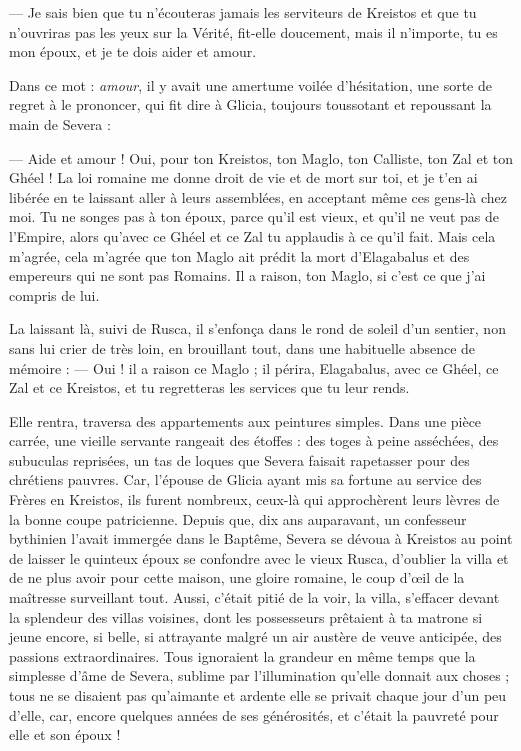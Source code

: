\documentclass[a4paper, 11pt, oneside, polutonikogreek, french]{article}
\begin{document}
--- Je sais bien que tu n'écouteras jamais les serviteurs de Kreistos et que tu n'ouvriras pas les yeux sur la Vérité, fit-elle doucement, mais il n'importe, tu es mon époux, et je te dois aider et amour.

Dans ce mot : \emph{amour}, il y avait une amertume voilée d'hésitation, une sorte de regret à le prononcer, qui fit dire à Glicia, toujours toussotant et repoussant la main de Severa :

--- Aide et amour ! Oui, pour ton Kreistos, ton Maglo, ton Calliste, ton Zal et ton Ghéel ! La loi romaine me donne droit de vie et de mort sur toi, et je t'en ai libérée en te laissant aller à leurs assemblées, en acceptant même ces gens-là chez moi. Tu ne songes pas à ton époux, parce qu'il est vieux, et qu'il ne veut pas de l'Empire, alors qu'avec ce Ghéel et ce Zal tu applaudis à ce qu'il fait. Mais cela m'agrée, cela m'agrée que ton Maglo ait prédit la mort d'Elagabalus et des empereurs qui ne sont pas Romains. Il a raison, ton Maglo, si c'est ce que j'ai compris de lui.

La laissant là, suivi de Rusca, il s'enfonça dans le rond de soleil d'un sentier, non sans lui crier de très loin, en brouillant tout, dans une habituelle absence de mémoire : --- Oui ! il a raison ce Maglo ; il périra, Elagabalus, avec ce Ghéel, ce Zal et ce Kreistos, et tu regretteras les services que tu leur rends.

Elle rentra, traversa des appartements aux peintures simples. Dans une pièce carrée, une vieille servante rangeait des étoffes : des toges à peine asséchées, des subuculas reprisées, un tas de loques que Severa faisait rapetasser pour des chrétiens pauvres. Car, l'épouse de Glicia ayant mis sa fortune au service des Frères en Kreistos, ils furent nombreux, ceux-là qui approchèrent leurs lèvres de la bonne coupe patricienne. Depuis que, dix ans auparavant, un confesseur bythinien l'avait immergée dans le Baptême, Severa se dévoua à Kreistos au point de laisser le quinteux époux se confondre avec le vieux Rusca, d'oublier la villa et de ne plus avoir pour cette maison, une gloire romaine, le coup d'œil de la maîtresse surveillant tout. Aussi, c'était pitié de la voir, la villa, s'effacer devant la splendeur des villas voisines, dont les possesseurs prêtaient à ta matrone si jeune encore, si belle, si attrayante malgré un air austère de veuve anticipée, des passions extraordinaires. Tous ignoraient la grandeur en même temps que la simplesse d'âme de Severa, sublime par l'illumination qu'elle donnait aux choses ; tous ne se disaient pas qu'aimante et ardente elle se privait chaque jour d'un peu d'elle, car, encore quelques années de ses générosités, et c'était la pauvreté pour elle et son époux !
\end{document}
